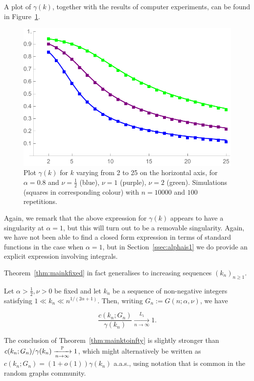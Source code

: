 \noindent
A plot of $\gamma(k)$,  together with the results of computer experiments, can be found in Figure~\ref{fig:gammak}. %
%
%
\begin{figure}[H]
    \centering
    \includegraphics[scale=0.6]{figures/ckn10000a08nu0512rep100k2to25Squares.pdf}
    \caption{Plot $\gamma(k)$ for $k$ varying from 2 to 25 on the horizontal axis, for $\alpha=0.8$ and $\nu=\frac{1}{2}$ 
    (blue), $\nu=1$ (purple), $\nu=2$ (green). Simulations (squares in corresponding colour) with $n=10000$ and $100$ repetitions.\label{fig:gammak}}
\end{figure}%
%
Again, we remark that the above expression for $\gamma(k)$ appears to have a singularity at $\alpha=1$, but this will turn out to be a removable singularity. 
Again, we have not been able to find a closed form expression in terms of standard functions in the case when $\alpha=1$, but in 
Section~\ref{ssec:alphais1} we do provide an explicit expression involving integrals.

Theorem~\ref{thm:mainkfixed} in fact generalises to increasing sequences $(k_n)_{n \ge 1}$.

\begin{theorem}\label{thm:mainktoinfty}
Let $\alpha>\frac12, \nu>0$ be fixed and let $k_n$ be a sequence of non-negative integers
satisfying $1 \ll k_n \ll n^{1/(2\alpha+1)}$. Then, writing $G_n := G(n;\alpha,\nu)$, we have

$$ \frac{c(k_n;G_n)}{\gamma(k_n)} \xrightarrow[n\to\infty]{L_1} 1. $$ 

\end{theorem}

\noindent
The conclusion of Theorem~\ref{thm:mainktoinfty} is slightly stronger than $c(k_n; G_n)/\gamma(k_n) 
\xrightarrow[n\to\infty]{\mathbb{P}} 1$, which might alternatively be written as $c(k_n;G_n) = (1+o(1)) \gamma(k_n)$ a.a.s., using notation that is common in the random graphs community.


